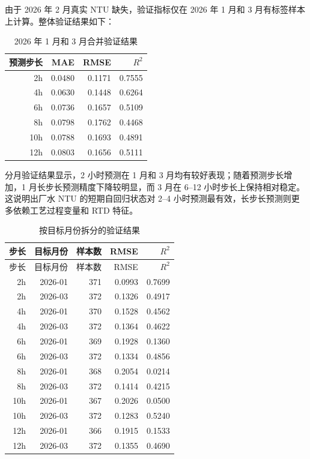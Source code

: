 \documentclass[UTF8,a4paper,12pt]{ctexart}
\begin{document}
由于 2026 年 2 月真实 NTU 缺失，验证指标仅在 2026 年 1 月和 3 月有标签样本上计算。整体验证结果如下：

\begin{table}[h]
\centering
\begin{tabular}{rrrr}
\toprule
预测步长 & MAE & RMSE & $R^2$ \\
\midrule
2h  & 0.0480 & 0.1171 & 0.7555 \\
4h  & 0.0630 & 0.1448 & 0.6264 \\
6h  & 0.0736 & 0.1657 & 0.5109 \\
8h  & 0.0798 & 0.1762 & 0.4468 \\
10h & 0.0788 & 0.1693 & 0.4891 \\
12h & 0.0803 & 0.1656 & 0.5111 \\
\bottomrule
\end{tabular}
\caption{2026 年 1 月和 3 月合并验证结果}
\end{table}

分月验证结果显示，2 小时预测在 1 月和 3 月均有较好表现；随着预测步长增加，1 月长步长预测精度下降较明显，而 3 月在 6--12 小时步长上保持相对稳定。这说明出厂水 NTU 的短期自回归状态对 2--4 小时预测最有效，长步长预测则更多依赖工艺过程变量和 RTD 特征。

\begin{longtable}{rrrrr}
\caption{按目标月份拆分的验证结果}\\
\toprule
步长 & 目标月份 & 样本数 & RMSE & $R^2$ \\
\midrule
\endfirsthead
\toprule
步长 & 目标月份 & 样本数 & RMSE & $R^2$ \\
\midrule
\endhead
2h  & 2026-01 & 371 & 0.0993 & 0.7699 \\
2h  & 2026-03 & 372 & 0.1326 & 0.4917 \\
4h  & 2026-01 & 370 & 0.1528 & 0.4562 \\
4h  & 2026-03 & 372 & 0.1364 & 0.4622 \\
6h  & 2026-01 & 369 & 0.1928 & 0.1360 \\
6h  & 2026-03 & 372 & 0.1334 & 0.4856 \\
8h  & 2026-01 & 368 & 0.2054 & 0.0214 \\
8h  & 2026-03 & 372 & 0.1414 & 0.4215 \\
10h & 2026-01 & 367 & 0.2026 & 0.0500 \\
10h & 2026-03 & 372 & 0.1283 & 0.5240 \\
12h & 2026-01 & 366 & 0.1915 & 0.1533 \\
12h & 2026-03 & 372 & 0.1355 & 0.4690 \\
\bottomrule
\end{longtable}
\end{document}
